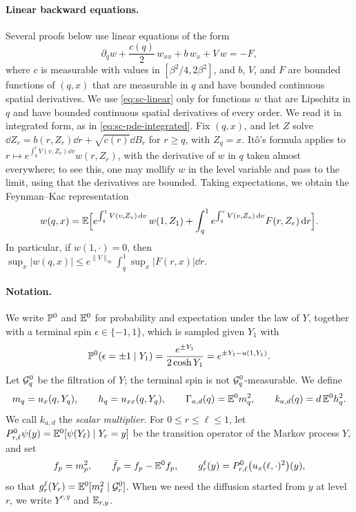 \paragraph{Linear backward equations.}
Several proofs below use linear equations of the form
\begin{equation}\label{eq:sc-linear}
 \partial_qw+\frac{c(q)}2\,w_{xx}+b\,w_x+V\,w=-F,
\end{equation}
where $c$ is measurable with values in $[\beta^2/4,2\beta^2]$, and
$b$, $V$, and $F$ are bounded functions of $(q,x)$ that are measurable
in $q$ and have bounded continuous spatial derivatives. We use
\eqref{eq:sc-linear} only for functions $w$ that are Lipschitz in $q$
and have bounded continuous spatial derivatives of every order. We
read it in integrated form, as in \eqref{eq:sc-pde-integrated}. Fix
$(q,x)$, and let $Z$ solve $\dd Z_r=b(r,Z_r)\dd r+\sqrt{c(r)}\dd B_r$
for $r\ge q$, with $Z_q=x$. Itô's formula applies to
$r\mapsto e^{\int_q^rV(v,Z_v)\dd v}w(r,Z_r)$, with the derivative of
$w$ in $q$ taken almost everywhere; to see this, one may mollify $w$ in
the level variable and pass to the limit, using that the derivatives
are bounded. Taking expectations, we obtain the Feynman--Kac
representation
\begin{equation}\label{eq:sc-backward}
 w(q,x)=\mathbb E\Bigl[e^{\int_q^1V(v,Z_v)\,\mathrm d v}\,w(1,Z_1)
   +\int_q^1e^{\int_q^rV(v,Z_v)\,\mathrm d v}F(r,Z_r)\,\mathrm d r\Bigr].
\end{equation}
In particular, if $w(1,\cdot)=0$, then
$\sup_x|w(q,x)|\le e^{\|V\|_\infty}\int_q^1\sup_x|F(r,x)|\dd r$.

\paragraph{Notation.}
We write $\mathbb P^0$ and $\mathbb E^0$ for probability and expectation under the
law of $Y$, together with a terminal spin $\epsilon\in\{-1,1\}$, which
is sampled given $Y_1$ with
\[
 \mathbb P^0(\epsilon=\pm1\mid Y_1)=\frac{e^{\pm Y_1}}{2\cosh Y_1}
 =e^{\pm Y_1-u(1,Y_1)}.
\]
Let $\mathcal G^0_q$ be the filtration of $Y$; the terminal spin is not
$\mathcal G^0_q$-measurable. We define
\[
 m_q=u_x(q,Y_q),\qquad h_q=u_{xx}(q,Y_q),\qquad
 \Gamma_{a,d}(q)=\mathbb E^0m_q^2,\qquad k_{a,d}(q)=d\,\mathbb E^0h_q^2 .
\]
We call $k_{a,d}$ the \emph{scalar multiplier}. For $0\le r\le\ell\le1$,
let $P^0_{r,\ell}\psi(y)=\mathbb E^0[\psi(Y_\ell)\mid Y_r=y]$ be the transition
operator of the Markov process $Y$, and set
\[
 f_p=m_p^2,\qquad \bar f_p=f_p-\mathbb E^0f_p,\qquad
 g_r^\ell(y)=P^0_{r,\ell}\bigl(u_x(\ell,\cdot)^2\bigr)(y),
\]
so that $g_r^\ell(Y_r)=\mathbb E^0[m_\ell^2\mid\mathcal G_r^0]$. When we need the
diffusion started from $y$ at level $r$, we write $Y^{r,y}$ and
$\mathbb E_{r,y}$.

